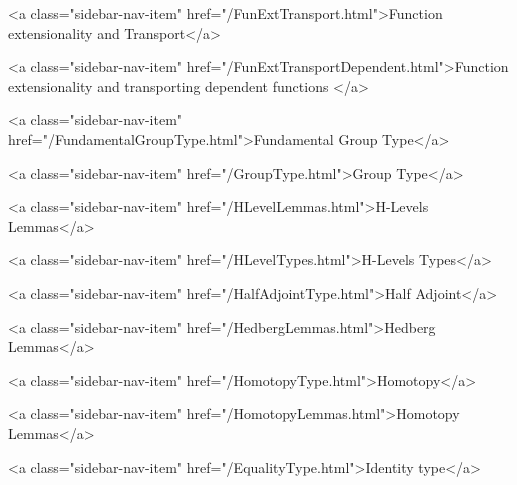      
        
          <a class="sidebar-nav-item" href="/FunExtTransport.html">Function extensionality and Transport</a>
        
      
    
      
        
          <a class="sidebar-nav-item" href="/FunExtTransportDependent.html">Function extensionality and transporting dependent functions </a>
        
      
    
      
        
          <a class="sidebar-nav-item" href="/FundamentalGroupType.html">Fundamental Group Type</a>
        
      
    
      
        
          <a class="sidebar-nav-item" href="/GroupType.html">Group Type</a>
        
      
    
      
        
          <a class="sidebar-nav-item" href="/HLevelLemmas.html">H-Levels Lemmas</a>
        
      
    
      
        
          <a class="sidebar-nav-item" href="/HLevelTypes.html">H-Levels Types</a>
        
      
    
      
        
          <a class="sidebar-nav-item" href="/HalfAdjointType.html">Half Adjoint</a>
        
      
    
      
        
          <a class="sidebar-nav-item" href="/HedbergLemmas.html">Hedberg Lemmas</a>
        
      
    
      
        
          <a class="sidebar-nav-item" href="/HomotopyType.html">Homotopy</a>
        
      
    
      
        
          <a class="sidebar-nav-item" href="/HomotopyLemmas.html">Homotopy Lemmas</a>
        
      
    
      
        
          <a class="sidebar-nav-item" href="/EqualityType.html">Identity type</a>
        
